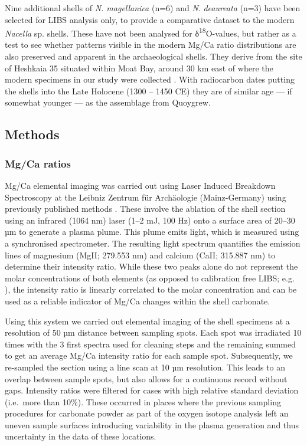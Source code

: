 \documentclass[
  authoryear,
  preprint,
  3p]{elsarticle}
\begin{document}
Nine additional shells of \emph{N. magellanica} (n=6) and \emph{N}.
\emph{deaureata} (n=3) have been selected for LIBS analysis only, to
provide a comparative dataset to the modern \emph{Nacella} sp. shells.
These have not been analysed for δ\textsuperscript{18}O-values, but
rather as a test to see whether patterns visible in the modern Mg/Ca
ratio distributions are also preserved and apparent in the
archaeological shells. They derive from the site of Heshkaia 35 situated
within Moat Bay, around 30 km east of where the modern specimens in our
study were collected \citep{Zangrando2014-qi, Zangrando2021-qg}. With
radiocarbon dates putting the shells into the Late Holocene (1300 --
1450 CE) they are of similar age --- if somewhat younger --- as the
assemblage from Quoygrew.

\subsection{Methods}\label{methods}

\subsubsection{Mg/Ca ratios}\label{mgca-ratios}

Mg/Ca elemental imaging was carried out using Laser Induced Breakdown
Spectroscopy at the Leibniz Zentrum für Archäologie (Mainz-Germany)
using previously published methods \citep{Hausmann2023-ih}. These
involve the ablation of the shell section using an infrared (1064 nm)
laser (1--2 mJ, 100 Hz) onto a surface area of 20--30 µm to generate a
plasma plume. This plume emits light, which is measured using a
synchronised spectrometer. The resulting light spectrum quantifies the
emission lines of magnesium (MgII; 279.553 nm) and calcium (CaII;
315.887 nm) to determine their intensity ratio. While these two peaks
alone do not represent the molar concentrations of both elements (as
opposed to calibration free LIBS; e.g.
\citep{Martinez-Minchero2022-jz}), the intensity ratio is linearly
correlated to the molar concentration \citep{Hausmann2017-oa} and can be
used as a reliable indicator of Mg/Ca changes within the shell
carbonate.

Using this system we carried out elemental imaging of the shell
specimens at a resolution of 50 µm distance between sampling spots. Each
spot was irradiated 10 times with the 3 first spectra used for cleaning
steps and the remaining summed to get an average Mg/Ca intensity ratio
for each sample spot. Subsequently, we re-sampled the section using a
line scan at 10 µm resolution. This leads to an overlap between sample
spots, but also allows for a continuous record without gaps. Intensity
ratios were filtered for cases with high relative standard deviation
(i.e.~more than 10\%). These occurred in places where the previous
sampling procedures for carbonate powder as part of the oxygen isotope
analysis left an uneven sample surfaces introducing variability in the
plasma generation and thus uncertainty in the data of these locations.
\end{document}
